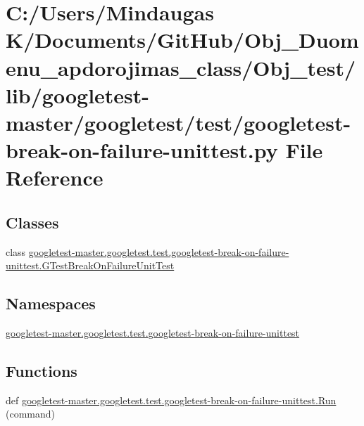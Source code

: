 \hypertarget{_obj__test_2lib_2googletest-master_2googletest_2test_2googletest-break-on-failure-unittest_8py}{}\section{C\+:/\+Users/\+Mindaugas K/\+Documents/\+Git\+Hub/\+Obj\+\_\+\+Duomenu\+\_\+apdorojimas\+\_\+class/\+Obj\+\_\+test/lib/googletest-\/master/googletest/test/googletest-\/break-\/on-\/failure-\/unittest.py File Reference}
\label{_obj__test_2lib_2googletest-master_2googletest_2test_2googletest-break-on-failure-unittest_8py}
\subsection*{Classes}
\begin{DoxyCompactItemize}
\item 
class \mbox{\hyperlink{classgoogletest-master_1_1googletest_1_1test_1_1googletest-break-on-failure-unittest_1_1_g_test_break_on_failure_unit_test}{googletest-\/master.\+googletest.\+test.\+googletest-\/break-\/on-\/failure-\/unittest.\+G\+Test\+Break\+On\+Failure\+Unit\+Test}}
\end{DoxyCompactItemize}
\subsection*{Namespaces}
\begin{DoxyCompactItemize}
\item 
 \mbox{\hyperlink{namespacegoogletest-master_1_1googletest_1_1test_1_1googletest-break-on-failure-unittest}{googletest-\/master.\+googletest.\+test.\+googletest-\/break-\/on-\/failure-\/unittest}}
\end{DoxyCompactItemize}
\subsection*{Functions}
\begin{DoxyCompactItemize}
\item 
def \mbox{\hyperlink{namespacegoogletest-master_1_1googletest_1_1test_1_1googletest-break-on-failure-unittest_a19acc4510ca9d815da7aecb0bd331279}{googletest-\/master.\+googletest.\+test.\+googletest-\/break-\/on-\/failure-\/unittest.\+Run}} (command)
\end{DoxyCompactItemize}
